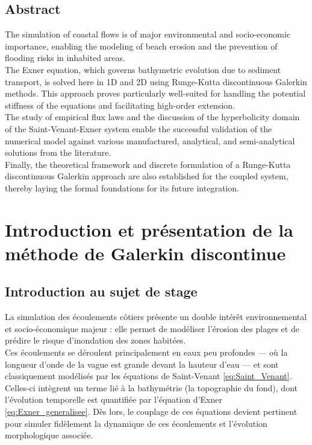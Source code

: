 \documentclass[11pt, a4paper, oneside]{report}
\begin{document}
\section*{Abstract}

The simulation of coastal flows is of major environmental and socio-economic importance, enabling the modeling of beach erosion and the prevention of flooding risks in inhabited areas. \\
The Exner equation, which governs bathymetric evolution due to sediment transport, is solved here in 1D and 2D using Runge-Kutta discontinuous Galerkin methods. This approach proves particularly well-suited for handling the potential stiffness of the equations and facilitating high-order extension. \\
The study of empirical flux laws and the discussion of the hyperbolicity domain of the Saint-Venant-Exner system enable the successful validation of the numerical model against various manufactured, analytical, and semi-analytical solutions from the literature. \\
Finally, the theoretical framework and discrete formulation of a Runge-Kutta discontinuous Galerkin approach are also established for the coupled system, thereby laying the formal foundations for its future integration.
\thispagestyle{empty}

\tableofcontents
\thispagestyle{empty}

\chapter{Introduction et présentation de la méthode de Galerkin discontinue}

\section{Introduction au sujet de stage}

\setcounter{page}{1}

La simulation des écoulements côtiers présente un double intérêt environnemental et socio-économique majeur : elle permet de modéliser l'érosion des plages et de prédire le risque d'inondation des zones habitées. \\
Ces écoulements se déroulent principalement en eaux peu profondes — où la longueur d'onde de la vague est grande devant la hauteur d'eau — et sont classiquement modélisés par les équations de Saint-Venant \eqref{eq:Saint_Venant}. Celles-ci intègrent un terme lié à la bathymétrie (la topographie du fond), dont l'évolution temporelle est quantifiée par l'équation d'Exner \eqref{eq:Exner_generalisee}. Dès lors, le couplage de ces équations devient pertinent pour simuler fidèlement la dynamique de ces écoulements et l'évolution morphologique associée. \\
\end{document}
